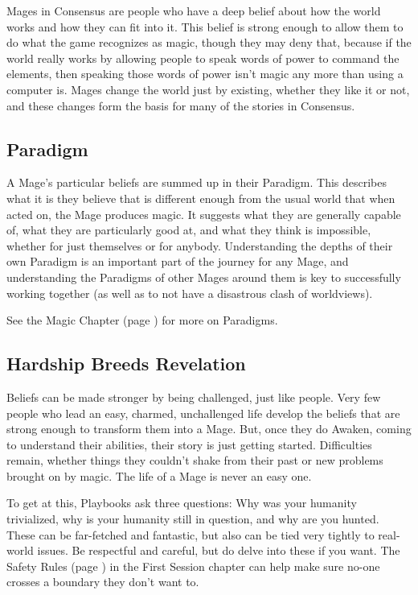 \documentclass[10pt,twoside,openright]{memoir}
\begin{document}
Mages in Consensus are people who have a deep belief about how the world
works and how they can fit into it. This belief is strong enough to
allow them to do what the game recognizes as magic, though they may deny
that, because if the world really works by allowing people to speak
words of power to command the elements, then speaking those words of
power isn't magic any more than using a computer is. Mages change the
world just by existing, whether they like it or not, and these changes
form the basis for many of the stories in Consensus.

\hypertarget{paradigm}{%
\subsection{Paradigm}\label{paradigm}}

A Mage's particular beliefs are summed up in their Paradigm. This
describes what it is they believe that is different enough from the
usual world that when acted on, the Mage produces magic. It suggests
what they are generally capable of, what they are particularly good at,
and what they think is impossible, whether for just themselves or for
anybody. Understanding the depths of their own Paradigm is an important
part of the journey for any Mage, and understanding the Paradigms of
other Mages around them is key to successfully working together (as well
as to not have a disastrous clash of worldviews).

See the Magic Chapter (page \pageref{Magic Chapter}) for more on Paradigms.

\hypertarget{hardship-breeds-revelation}{%
\subsection{Hardship Breeds
Revelation}\label{hardship-breeds-revelation}}

Beliefs can be made stronger by being challenged, just like people. Very
few people who lead an easy, charmed, unchallenged life develop the
beliefs that are strong enough to transform them into a Mage. But, once
they do Awaken, coming to understand their abilities, their story is
just getting started. Difficulties remain, whether things they couldn't
shake from their past or new problems brought on by magic. The life of a
Mage is never an easy one.

To get at this, Playbooks ask three questions: Why was your humanity trivialized, why is your humanity still in question, and why are you hunted. These can be far-fetched and fantastic, but also can be tied very tightly to real-world issues. Be respectful and careful, but do delve into these if you want. The Safety Rules (page \pageref{Safety Rules}) in the First Session chapter can help make sure no-one crosses a boundary they don’t want to.
\end{document}
